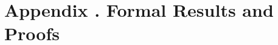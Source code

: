 
\section[Formal Results and Proofs]{Appendix \thesection. Formal Results and Proofs}\label{app:proofs}

\setcounter{lemma}{0}\setcounter{proposition}{0}\setcounter{corollary}{0}\setcounter{definition}{0}\setcounter{remark}{0}
\renewcommand{\thelemma}{A\arabic{lemma}}
\renewcommand{\theproposition}{A\arabic{proposition}}
\renewcommand{\thecorollary}{A\arabic{corollary}}
\renewcommand{\thedefinition}{A\arabic{definition}}
\renewcommand{\theremark}{A\arabic{remark}}
\renewcommand{\theHlemma}{A\arabic{lemma}}\renewcommand{\theHproposition}{A\arabic{proposition}}
\renewcommand{\theHcorollary}{A\arabic{corollary}}\renewcommand{\theHdefinition}{A\arabic{definition}}\renewcommand{\theHremark}{A\arabic{remark}}
\providecommand{\Var}{\operatorname{Var}}
\providecommand{\Cov}{\operatorname{Cov}}
\providecommand{\E}{\mathbb{E}}
\setlength{\emergencystretch}{2em}%

